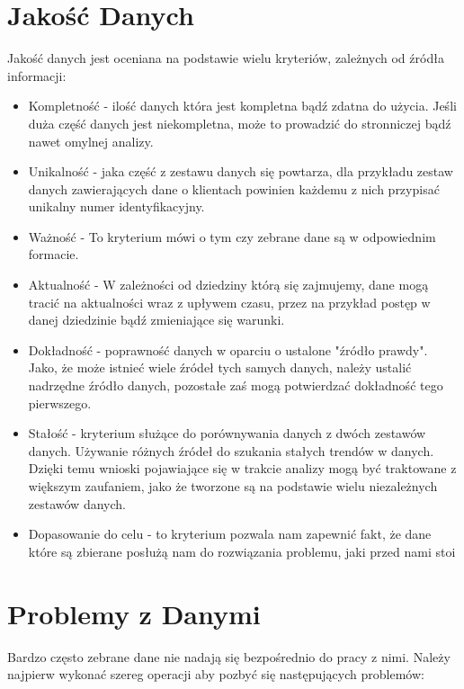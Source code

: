 \documentclass[oneside]{book}
\begin{document}
\section{Jakość Danych}
Jakość danych jest oceniana na podstawie 
wielu kryteriów, zależnych od źródła informacji\cite{data_quality}:
\begin{itemize}
    \item Kompletność - ilość danych która jest kompletna bądź zdatna do użycia. Jeśli duża 
    część danych jest niekompletna, może to 
    prowadzić do stronniczej bądź nawet omylnej analizy. 
    \item Unikalność - jaka część z zestawu danych się powtarza, 
    dla przykładu zestaw danych zawierających dane o klientach 
    powinien każdemu z nich przypisać unikalny numer identyfikacyjny.
    \item Ważność - To kryterium mówi o tym 
    czy zebrane dane są w odpowiednim formacie.
    \item Aktualność - W zależności od dziedziny którą się zajmujemy, dane mogą tracić na aktualności wraz 
    z upływem czasu, przez na przykład postęp w danej 
    dziedzinie bądź zmieniające się warunki.
    \item Dokładność - poprawność danych w oparciu o ustalone "źródło prawdy". 
    Jako, że może istnieć wiele źródeł tych samych danych, 
    należy ustalić nadrzędne źródło danych, pozostałe 
    zaś mogą potwierdzać dokładność tego pierwszego.
    \item Stałość - kryterium służące do porównywania danych z dwóch zestawów danych. 
    Używanie różnych źródeł do szukania stałych trendów w danych. 
    Dzięki temu wnioski pojawiające się w trakcie analizy mogą być 
    traktowane z większym zaufaniem, jako że tworzone są na podstawie wielu niezależnych zestawów danych.
    \item Dopasowanie do celu - to kryterium pozwala nam zapewnić fakt, 
    że dane które są zbierane posłużą nam do rozwiązania problemu, jaki przed nami stoi
  \end{itemize}

\section{Problemy z Danymi}

Bardzo często zebrane dane nie nadają się bezpośrednio do pracy z nimi. 
Należy najpierw wykonać szereg operacji aby pozbyć się następujących 
problemów:   
\end{document}
